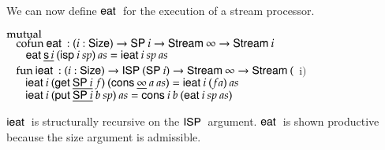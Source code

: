 We can now define $\mathsf{eat}\:$ for the execution of a stream processor.
\begin{bsp}
$\mathrm{mutual}\: $\\
$\hspace*{3mm} \mathrm{cofun}\: \mathsf{eat}\: : (i : \mathsf{Size} ) \rightarrow \mathsf{SP}\: i \rightarrow \mathsf{Stream}\: \infty \rightarrow \mathsf{Stream}\: i$ \\
$\spc \spc \eat \inacc{\s i} \: (\isp i \: sp) \: as = \ieat i \: sp \: as $ \\
$\hspace*{3mm} \mathrm{fun}\: \mathsf{ieat}\: : (i : \mathsf{Size} ) \rightarrow \mathsf{ISP}\: (\mathsf{SP}\: i) \rightarrow \mathsf{Stream}\: \infty \rightarrow \mathsf{Stream}\: ($ i$)$\\
$\spc \spc \ieat i\: (\getd \inacc{\spd i} \: f) \: (\cons \inacc{\infty} \: a \: as) = \ieat i \: (f a) \: as$\\
$\spc \spc \ieat i\: (\putd \inacc{\spd i} \: b \: sp) \: as  = \cons i \: b \: (\eat i \: sp \: as) $\\
\end{bsp}
$\mathsf{ieat}\:$ is structurally recursive on the $\mathsf{ISP}\:$ argument.
$\mathsf{eat}\:$ is shown productive because the size argument is admissible.
